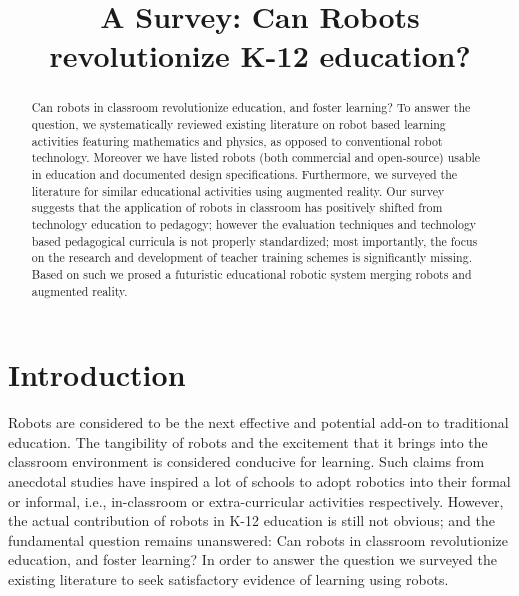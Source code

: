 \documentclass[conference]{IEEEtran}
\begin{document}
\title{A Survey: Can Robots revolutionize K-12 education?}
\author{
}
  
\maketitle

\begin{abstract}
Can robots in classroom revolutionize education, and foster learning? To answer the question, we systematically 
reviewed existing literature on robot based learning activities featuring mathematics and physics, as opposed to 
conventional robot technology. Moreover we have listed robots (both commercial and open-source) usable in education 
and documented design specifications. Furthermore, we surveyed the literature for similar educational activities 
using augmented reality. Our survey suggests that the application of robots in classroom has positively shifted from 
technology education to pedagogy; however the evaluation techniques and technology based pedagogical curricula is 
not properly standardized; most importantly, the focus on the research and development of teacher training schemes is 
significantly missing. Based on such we prosed a futuristic educational robotic system merging robots and augmented 
reality. 
\end{abstract}

\IEEEpeerreviewmaketitle
\section{Introduction}
Robots are considered to be the next effective and potential add-on to traditional education. The tangibility of robots 
and the excitement that it brings into the classroom environment is considered conducive for learning. Such claims from 
anecdotal studies have inspired a lot of schools to adopt robotics into their formal or informal, i.e., in-classroom or 
extra-curricular activities respectively. However, the actual contribution of robots in K-12 education is still not 
obvious; and the fundamental question remains unanswered: Can robots in classroom revolutionize education, and foster 
learning? In order to answer the question we surveyed the existing literature to seek satisfactory evidence of learning 
using robots. 
\end{document}

